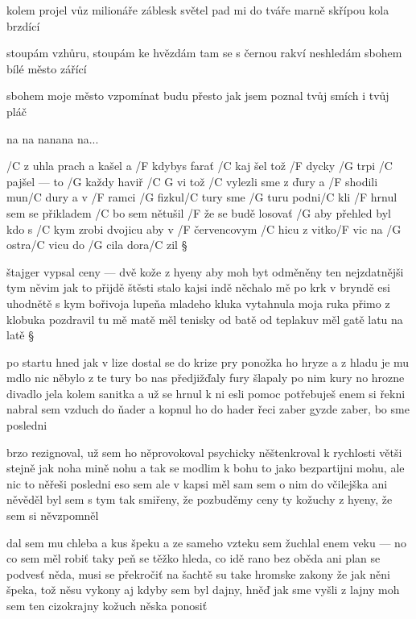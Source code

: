 kolem projel vůz milionáře
záblesk světel pad mi do tváře
marně skřípou kola brzdící \s

stoupám vzhůru, stoupám ke hvězdám
tam se s černou rakví neshledám
sbohem bílé město zářící \s

sbohem moje město
vzpomínat budu přesto
jak jsem poznal tvůj smích
i tvůj pláč \s

na na nanana na...




/C z uhla prach a kašel a /F kdybys farať /C kaj šel
tož /F dycky /G trpi /C pajšel --- to /G každy haviř /{C G} vi
tož /C vylezli sme z ďury a /F shodili mun/C dury
a v /F ramci /G fizkul/C tury sme /G turu podni/C kli
/F hrnul sem se přikladem /C bo sem nětušil
/F že se budě losovať /G aby přehled byl
kdo s /C kym zrobi dvojicu aby v /F červencovym /C hicu
z vitko/F vic na /G ostra/C vicu do /G cila dora/C zil \S

štajger vypsal ceny --- dvě kože z hyeny
aby moh byt odměněny ten nejzdatnějši tym
něvim jak to přijdě štěsti stalo kajsi indě
něchalo mě po krk v bryndě esi uhodnětě s kym
bořivoja lupeňa mladeho kluka
vytahnula moja ruka přimo z klobuka
pozdravil tu mě matě měl tenisky od batě
od teplakuv měl gatě latu na latě \S

po startu hned jak v lize dostal se do krize
pry ponožka ho hryze a z hladu je mu mdlo
nic něbylo z te tury bo nas předjižďaly fury
šlapaly po nim kury no hrozne divadlo
jela kolem sanitka a už se hrnul k ni
esli pomoc potřebuješ enem si řekni
nabral sem vzduch do ňader a kopnul ho do hader
řeci zaber gyzde zaber, bo sme posledni \s

brzo rezignoval, už sem ho něprovokoval
psychicky něštenkroval k rychlosti větši
stejně jak noha mině nohu a tak se modlim k bohu
to jako bezpartijni mohu, ale nic to něřeši
posledni eso sem ale v kapsi měl
sam sem o nim do včilejška ani něvěděl
byl sem s tym tak smiřeny, že pozbuděmy ceny
ty kožuchy z hyeny, že sem si něvzpomněl \songgg

dal sem mu chleba a kus špeku a ze sameho vzteku
sem žuchlal enem veku --- no co sem měl robiť
taky peň se těžko hleda, co idě rano bez oběda
ani plan se podvesť něda, musi se překročiť
na šachtě su take hromske zakony
že jak něni špeka, tož něsu vykony
aj kdyby sem byl dajny, hněď jak sme vyšli z lajny
moh sem ten cizokrajny kožuch něska ponosiť




